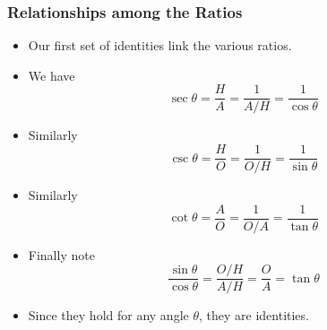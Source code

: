 \documentclass[serif,ignorenonframetext]{beamer}
\begin{document}
\begin{frame}
  \frametitle{Relationships among the Ratios}
  \begin{itemize}[<+->]
  \item Our first set of identities link the various ratios.
  \item We have 
    \begin{equation*}
      \sec \theta 
      = \frac{H}{A} = \frac{1}{A/H} = \frac{1}{\cos \theta}
    \end{equation*}
  \item Similarly 
    \begin{equation*}
      \csc \theta = \frac{H}{O} = \frac{1}{O/H} = \frac{1}{\sin
        \theta}
    \end{equation*}
  \item Similarly
    \begin{equation*}
      \cot\theta = \frac{A}{O} = \frac{1}{O/A} = \frac{1}{\tan \theta} 
    \end{equation*}
  \item Finally note 
    \begin{equation*}
      \frac{\sin\theta}{\cos\theta} = \frac{O/H}{A/H} = \frac{O}{A} 
      = \tan\theta
    \end{equation*}
  \item Since they hold for any angle $\theta$, they are identities.
  \end{itemize}
\end{frame}
\end{document}
